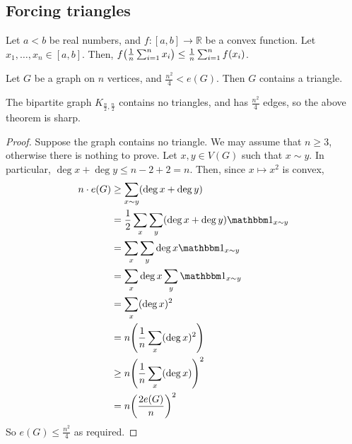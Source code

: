 \subsection{Forcing triangles}
\begin{proposition}[Jensen]
	Let \( a < b \) be real numbers, and \( f \colon [a,b] \to \mathbb R \) be a convex function.
	Let \( x_1, \dots, x_n \in [a,b] \).
	Then, \( f\qty(\frac{1}{n}\sum_{i=1}^n x_i) \leq \frac{1}{n} \sum_{i=1}^n f(x_i) \).
\end{proposition}
\begin{theorem}[Mantel]
	Let \( G \) be a graph on \( n \) vertices, and \( \frac{n^2}{4} < e(G) \).
	Then \( G \) contains a triangle.
\end{theorem}
\begin{remark}
	The bipartite graph \( K_{\frac{n}{2}, \frac{n}{2}} \) contains no triangles, and has \( \frac{n^2}{4} \) edges, so the above theorem is sharp.
\end{remark}
\begin{proof}
	Suppose the graph contains no triangle.
	We may assume that \( n \geq 3 \), otherwise there is nothing to prove.
	Let \( x, y \in V(G) \) such that \( x \sim y \).
	In particular, \( \deg x + \deg y \leq n - 2 + 2 = n \).
	Then, since \( x \mapsto x^2 \) is convex,
	\begin{align*}
		n\cdot e(G) &\geq \sum_{x \sim y} (\deg x + \deg y) \\
		&= \frac{1}{2} \sum_x \sum_y (\deg x + \deg y) \mathbbm 1_{x \sim y} \\
		&= \sum_x \sum_y \deg x \mathbbm 1_{x \sim y} \\
		&= \sum_x \deg x \sum_y \mathbbm 1_{x \sim y} \\
		&= \sum_x (\deg x)^2 \\
		&= n \qty( \frac{1}{n} \sum_x (\deg x)^2 ) \\
		&\geq n \qty( \frac{1}{n} \sum_x (\deg x) )^2 \\
		&= n \qty( \frac{2e(G)}{n} )^2
	\end{align*}
	So \( e(G) \leq \frac{n^2}{4} \) as required.
\end{proof}

